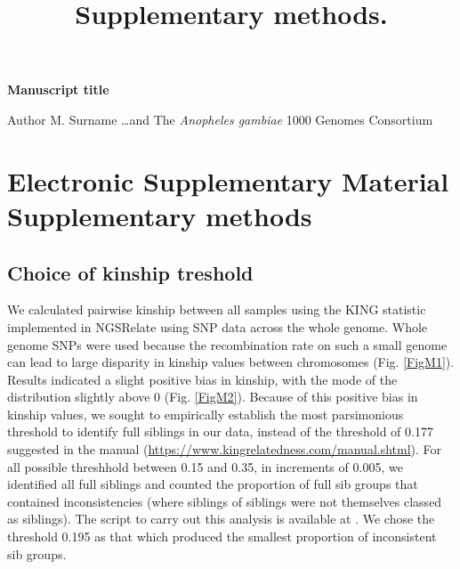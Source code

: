 \documentclass[a4paper,12pt]{article}
\title{Supplementary methods.}
\begin{document}
\onehalfspacing

\begin{center}
	\Large
	\noindent \textbf{Manuscript title}

	\normalsize

	\vskip 3cm

\end{center}


\noindent Author M. Surname \ldots and The \textit{Anopheles gambiae} 1000 Genomes Consortium
 
\vskip 2cm 


\section*{Electronic Supplementary Material \\ Supplementary methods}

\clearpage

\subsection{Choice of kinship treshold}

We calculated pairwise kinship between all samples using the KING statistic \parencite{Man10} implemented in NGSRelate \parencite{Kor15} using SNP data across the whole genome. Whole genome SNPs were used because the recombination rate on such a small genome can lead to large disparity in kinship values between chromosomes (Fig. \ref{FigM1}). Results indicated a slight positive bias in kinship, with the mode of the distribution slightly above 0 (Fig. \ref{FigM2}). Because of this positive bias in kinship values, we sought to empirically establish the most parsimonious threshold to identify full siblings in our data, instead of the threshold of 0.177 suggested in the manual (\url{https://www.kingrelatedness.com/manual.shtml}). For all possible threshhold between 0.15 and 0.35, in increments of 0.005, we identified all full siblings and counted the proportion of full sib groups that contained inconsistencies (where siblings of siblings were not themselves classed as siblings). The script to carry out this analysis is available at . We chose the threshold 0.195 as that which produced the smallest proportion of inconsistent sib groups. 
\end{document}

